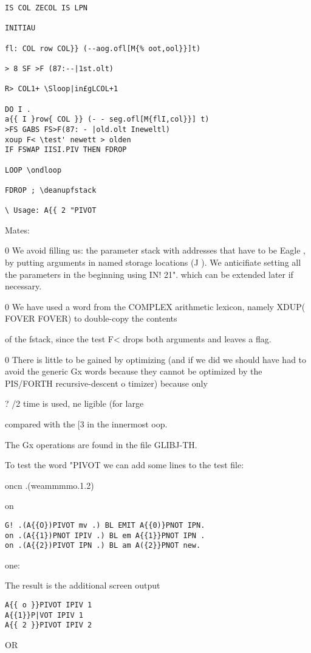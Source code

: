 {{{\begin{verbatim}
IS COL ZECOL IS LPN

INITIAU

fl: COL row COL}} (--aog.ofl[M{% oot,ool}}]t)

> 8 SF >F (87:--|1st.olt)

R> COL1+ \Sloop|in£gLCOL+1

DO I .
a{{ I }row{ COL }} (- - seg.ofl[M{flI,col}}] t)
>FS GABS FS>F(87: - |old.olt Ineweltl)
xoup F< \test' newett > olden
IF FSWAP IISI.PIV THEN FDROP

LOOP \ondloop

FDROP ; \deanupfstack

\ Usage: A{{ 2 "PIVOT
\end{verbatim}

Mates:

0 We avoid filling us: the parameter stack with addresses that
have to be Eagle , by putting arguments in named storage
locations (J ). We anticifiate setting all the parameters in
the beginning using IN! 21". which can be extended later
if necessary.

0 We have used a word from the COMPLEX arithmetic lexicon,
namely XDUP( FOVER FOVER) to double-copy the contents

of the fstack, since the test F< drops both arguments and
leaves a flag.

0 There is little to be gained by optimizing (and if we did we
should have had to avoid the generic Gx words because they
cannot be optimized by the PIS/FORTH recursive-descent
o timizer) because only}? /2 time is used, ne ligible (for large

compared with the [3 in the innermost oop.

The Gx operations are found in the file GLIBJ-TH.

To test the word "PIVOT we can add some lines to the test file:

oncn .(weammmmo.1.2)

on

\begin{verbatim}
G! .(A{{O})PIVOT mv .) BL EMIT A{{0)}PNOT IPN.
on .(A{{1})PNOT IPIV .) BL em A{{1}}PNOT IPN .
on .(A{{2})PIVOT IPN .) BL am A({2}}PNOT new.
\end{verbatim}
one:


The result is the additional screen output

\begin{verbatim}
A{{ o }}PIVOT IPIV 1
A{{1}}P|VOT IPIV 1
A{{ 2 }}PIVOT IPIV 2
\end{verbatim}
OR

}}
